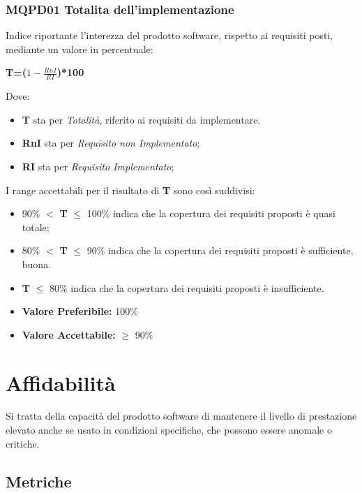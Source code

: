 \subsubsection{MQPD01 Totalita dell’implementazione} \label{QualitàDelProdottoFunzionalitàMetricheMQPD01}
Indice riportante l’interezza del prodotto software, rispetto ai requisiti posti, mediante un valore in percentuale:
\begin{center}
	\textbf{T=($1-\frac{RnI}{RI}$)*100}
\end{center}
Dove:
\begin{itemize}
	\item \textbf{T} sta per \textit{Totalità}, riferito ai requisiti da implementare.
	\item \textbf{RnI} sta per \textit{Requisito non Implementato};
	\item \textbf{RI} sta per \textit{Requisito Implementato};
\end{itemize}
I range accettabili per il risultato di \textbf{T} sono così suddivisi:
\begin{itemize}
	\item 90\% $<$ \textbf{T} $\leq$ 100\% indica che la copertura dei requisiti proposti è quasi totale;
	\item 80\% $<$ \textbf{T} $\leq$ 90\% indica che la copertura dei requisiti proposti è sufficiente, buona.
	\item \textbf{T} $\leq$ 80\% indica che la copertura dei requisiti proposti è insufficiente.
\end{itemize}
\begin{itemize}
	\item \textbf{Valore Preferibile:} 100\% 
	\item \textbf{Valore  Accettabile:} $\geq$ 90\% 
\end{itemize}

\section{Affidabilità} \label{QualitàDelProdottoAffidabilità}
Si tratta della capacità del prodotto software di mantenere il livello di prestazione elevato anche se usato in condizioni specifiche, che possono essere anomale o critiche. 
\subsection{Metriche} \label{QualitàDelProdottoAffidabilitàMetriche}
